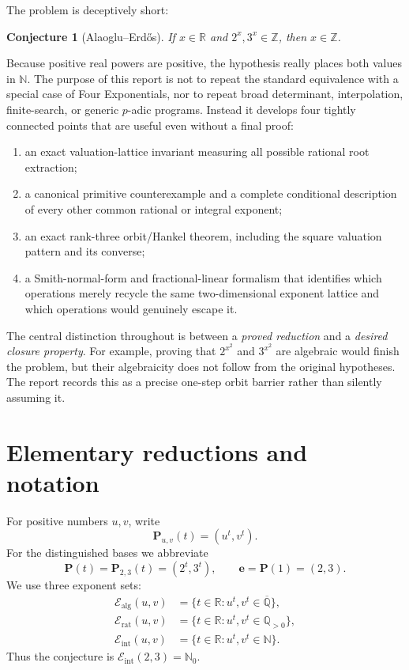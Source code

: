 \documentclass[11pt]{article}
\numberwithin{equation}{section}
\newtheorem{conjecture}[theorem]{Conjecture}
\theoremstyle{definition}
\newcommand{\Q}{\mathbb{Q}}
\newcommand{\Z}{\mathbb{Z}}
\newcommand{\N}{\mathbb{N}}
\newcommand{\R}{\mathbb{R}}
\newcommand{\Qbar}{\overline{\mathbb{Q}}}
\newcommand{\Pair}{\mathbf P}
\newcommand{\axis}{\mathbf e}
\newcommand{\Ealg}{\mathcal E_{\mathrm{alg}}}
\newcommand{\Erat}{\mathcal E_{\mathrm{rat}}}
\newcommand{\Eint}{\mathcal E_{\mathrm{int}}}
\begin{document}
The problem is deceptively short:
\begin{conjecture}[Alaoglu--Erd\H{o}s]
If \(x\in\R\) and \(2^x,3^x\in\Z\), then \(x\in\Z\).
\end{conjecture}
Because positive real powers are positive, the hypothesis really places both values in \(\N\). The purpose of this report is not to repeat the standard equivalence with a special case of Four Exponentials, nor to repeat broad determinant, interpolation, finite-search, or generic \(p\)-adic programs. Instead it develops four tightly connected points that are useful even without a final proof:

\begin{enumerate}
\item an exact valuation-lattice invariant measuring all possible rational root extraction;
\item a canonical primitive counterexample and a complete conditional description of every other common rational or integral exponent;
\item an exact rank-three orbit/Hankel theorem, including the square valuation pattern and its converse;
\item a Smith-normal-form and fractional-linear formalism that identifies which operations merely recycle the same two-dimensional exponent lattice and which operations would genuinely escape it.
\end{enumerate}

The central distinction throughout is between a \emph{proved reduction} and a \emph{desired closure property}. For example, proving that \(2^{x^2}\) and \(3^{x^2}\) are algebraic would finish the problem, but their algebraicity does not follow from the original hypotheses. The report records this as a precise one-step orbit barrier rather than silently assuming it.

\section{Elementary reductions and notation}

For positive numbers \(u,v\), write
\[
  \Pair_{u,v}(t)=(u^t,v^t).
\]
For the distinguished bases we abbreviate
\[
  \Pair(t)=\Pair_{2,3}(t)=(2^t,3^t),
  \qquad \axis=\Pair(1)=(2,3).
\]
We use three exponent sets:
\begin{align*}
 \Ealg(u,v)&=\{t\in\R:u^t,v^t\in\Qbar\},\\
 \Erat(u,v)&=\{t\in\R:u^t,v^t\in\Q_{>0}\},\\
 \Eint(u,v)&=\{t\in\R:u^t,v^t\in\N\}.
\end{align*}
Thus the conjecture is \(\Eint(2,3)=\N_0\).
\end{document}
